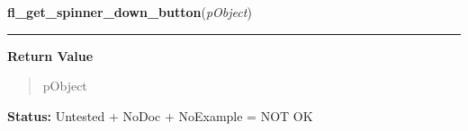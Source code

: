     \vspace{0.5ex}

\hspace{.8\funcindent}\begin{boxedminipage}{\funcwidth}

    \raggedright \textbf{fl\_get\_spinner\_down\_button}(\textit{pObject})

    \vspace{-1.5ex}

    \rule{\textwidth}{0.5\fboxrule}
\setlength{\parskip}{2ex}
\setlength{\parskip}{1ex}
      \textbf{Return Value}
    \vspace{-1ex}

      \begin{quote}
      pObject

      \end{quote}

\textbf{Status:} Untested + NoDoc + NoExample = NOT OK



    \end{boxedminipage}

    \label{xformslib:library:fl_add_tabfolder}

    \vspace{0.5ex}

